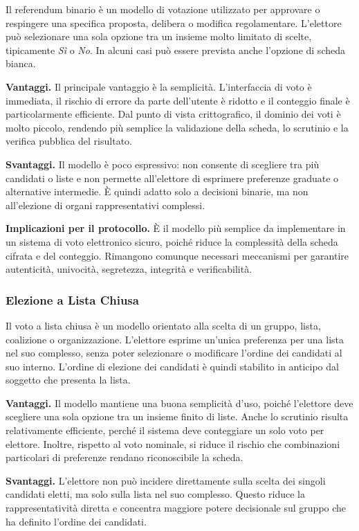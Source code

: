 \documentclass[12pt,a4paper]{article}
\begin{document}
Il referendum binario è un modello di votazione utilizzato per approvare o respingere una
specifica proposta, delibera o modifica regolamentare. L'elettore può selezionare una sola
opzione tra un insieme molto limitato di scelte, tipicamente \textit{Sì} o \textit{No}.
In alcuni casi può essere prevista anche l’opzione di scheda bianca.

\textbf{Vantaggi.} Il principale vantaggio è la semplicità. L’interfaccia di voto è immediata,
il rischio di errore da parte dell’utente è ridotto e il conteggio finale è particolarmente efficiente.
Dal punto di vista crittografico, il dominio dei voti è molto piccolo, rendendo più semplice la
validazione della scheda, lo scrutinio e la verifica pubblica del risultato.

\textbf{Svantaggi.} Il modello è poco espressivo: non consente di scegliere tra più candidati o liste e
non permette all’elettore di esprimere preferenze graduate o alternative intermedie. È quindi adatto solo
a decisioni binarie, ma non all’elezione di organi rappresentativi complessi.

\textbf{Implicazioni per il protocollo.} È il modello più semplice da implementare in un
sistema di voto elettronico sicuro, poiché riduce la complessità della scheda cifrata e del
conteggio. Rimangono comunque necessari meccanismi per garantire autenticità, univocità,
segretezza, integrità e verificabilità.

\subsubsection{Elezione a Lista Chiusa}

Il voto a lista chiusa è un modello orientato alla scelta di un gruppo, lista, coalizione o
organizzazione. L'elettore esprime un'unica preferenza per una lista nel suo complesso, senza
poter selezionare o modificare l'ordine dei candidati al suo interno. L'ordine di elezione dei
candidati è quindi stabilito in anticipo dal soggetto che presenta la lista.

\textbf{Vantaggi.} Il modello mantiene una buona semplicità d’uso, poiché l’elettore
deve scegliere una sola opzione tra un insieme finito di liste. Anche lo scrutinio risulta
relativamente efficiente, perché il sistema deve conteggiare un solo voto per elettore.
Inoltre, rispetto al voto nominale, si riduce il rischio che combinazioni particolari di
preferenze rendano riconoscibile la scheda.

\textbf{Svantaggi.} L’elettore non può incidere direttamente sulla scelta dei singoli candidati
eletti, ma solo sulla lista nel suo complesso. Questo riduce la rappresentatività diretta e concentra
maggiore potere decisionale sul gruppo che ha definito l’ordine dei candidati.
\end{document}
